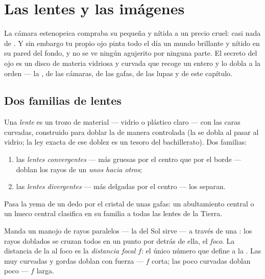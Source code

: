 \chapter{Las lentes y las imágenes}\label{ch:g8:lenses-images}

La cámara estenopeica compraba su  pequeña y nítida a un
precio cruel: casi nada de . Y sin embargo tu propio ojo pinta
todo el día un mundo brillante y nítido en su pared del fondo, y no se
ve ningún agujerito por ninguna parte. El secreto del ojo es un disco
de materia vidriosa y curvada que recoge un  entero y lo dobla a
la orden --- la ,  de las cámaras, de las gafas,
de las lupas y de este capítulo.

\section{Dos familias de lentes}

\begin{definition}\label{def:g8:lenses-images:families}
Una \emph{lente} es un trozo de material
 --- vidrio o plástico claro --- con las caras
curvadas, construido para doblar la  de manera controlada (la
 se dobla al pasar al vidrio; la ley exacta de ese doblez es un
tesoro del bachillerato). Dos familias:
\begin{enumerate}
  \item las \emph{lentes convergentes} ---
        más gruesas por el centro que por el borde --- doblan los
        rayos de un  \emph{unos hacia otros};
  \item las \emph{lentes divergentes} ---
        más delgadas por el centro --- los separan.
\end{enumerate}
Pasa la yema de un dedo por el cristal de unas gafas: un abultamiento
central o un hueco central clasifica en su familia a todas las lentes
de la Tierra.
\end{definition}

\begin{definition}\label{def:g8:lenses-images:focus}
Manda un manojo de rayos paralelos --- la  del Sol sirve --- a
través de una : los rayos doblados se cruzan
todos en un punto por detrás de ella, el \emph{foco}. La
distancia de la  al foco es la \emph{distancia
focal} $f$: el único número que define a la
. Las  muy curvadas y gordas doblan con fuerza --- $f$
corta; las poco curvadas doblan poco --- $f$ larga.
\end{definition}

